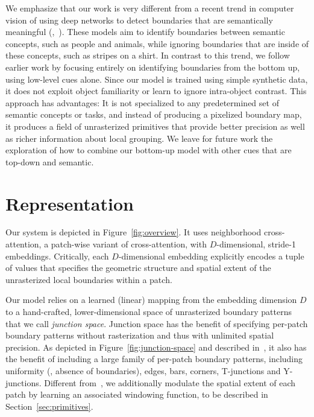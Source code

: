 \documentclass[main.tex]{subfiles}
\begin{document}
We emphasize that our work is very different from a recent trend in computer vision of using deep networks to detect boundaries that are semantically meaningful (\eg,~\cite{su2021pixel, pu2022edter, zhou2023treasure}). These models aim to identify boundaries between semantic concepts, such as people and animals, while ignoring boundaries that are inside of these concepts, such as stripes on a shirt. In contrast to this trend, we follow earlier work by focusing entirely on identifying boundaries from the bottom up, using low-level cues alone. Since our model is trained using simple synthetic data, it does not exploit object familiarity or learn to ignore intra-object contrast. This approach has advantages: It is not specialized to any predetermined set of semantic concepts or tasks, and instead of producing a pixelized boundary map, it produces a field of unrasterized primitives that provide better precision as well as richer information about local grouping. We leave for future work the exploration of how to combine our bottom-up model with other cues that are top-down and semantic.

\section{Representation}
\label{sec:representation}

Our system is depicted in Figure~\ref{fig:overview}. It uses neighborhood cross-attention, a patch-wise variant of cross-attention, with $D$-dimensional, stride-1  embeddings. Critically, each $D$-dimensional embedding explicitly encodes a tuple of values that specifies the geometric structure and spatial extent of the unrasterized local boundaries within a patch. 

Our model relies on a  learned (linear) mapping from the embedding dimension $D$ to a hand-crafted, lower-dimensional space of unrasterized boundary patterns that we call \emph{junction space}. Junction space has the benefit of specifying per-patch boundary patterns without rasterization and thus with unlimited spatial precision. As depicted in Figure~\ref{fig:junction-space} and described in~\cite{verbin2021field}, it also has the benefit of including a large family of per-patch boundary patterns, including uniformity (\ie, absence of boundaries), edges, bars, corners, T-junctions and Y-junctions. Different from~\cite{verbin2021field}, we additionally  modulate the spatial extent of each patch by learning an associated windowing function, to be described in Section~\ref{sec:primitives}.
\end{document}
